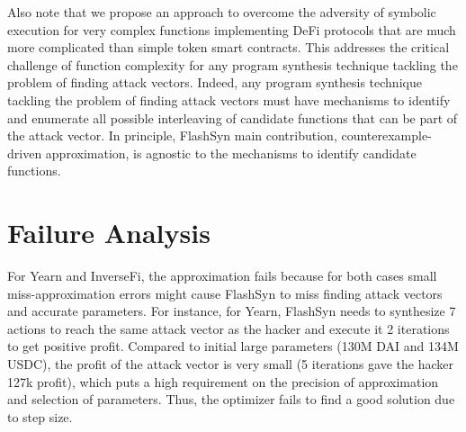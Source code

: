 Also note that we propose an approach to overcome the adversity of symbolic execution for very complex functions implementing DeFi protocols that are much more complicated than simple token smart contracts. This addresses the critical challenge of function complexity for any program synthesis technique tackling the problem of finding attack vectors. Indeed, any program synthesis technique tackling the problem of finding attack vectors must have mechanisms to identify and enumerate all possible interleaving of candidate functions that can be part of the attack vector. In principle, FlashSyn main contribution, counterexample-driven approximation, is agnostic to the mechanisms to identify candidate functions.


\section{Failure Analysis}


For Yearn and InverseFi, the approximation fails because for both cases small miss-approximation errors might cause FlashSyn to miss finding attack vectors and accurate parameters. For instance, for Yearn, FlashSyn needs to synthesize 7 actions to reach the same attack vector as the hacker and execute it 2 iterations to get positive profit. Compared to initial large parameters (130M DAI and 134M USDC), the profit of the attack vector is very small (5 iterations gave the hacker 127k profit), which puts a high requirement on the precision of approximation and selection of parameters. Thus, the optimizer fails to find a good solution due to step size. 





